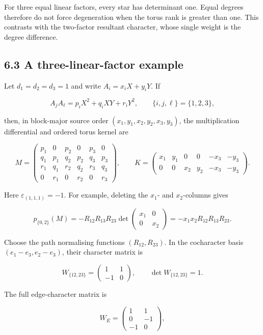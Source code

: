 \documentclass[
  11pt,
  a4paper,
]{article}
\begin{document}
For three equal linear factors, every star has determinant one. Equal
degrees therefore do not force degeneration when the torus rank is
greater than one. This contrasts with the two-factor resultant
character, whose single weight is the degree difference.

\subsection{6.3 A three-linear-factor
example}\label{a-three-linear-factor-example}

Let \(d_1=d_2=d_3=1\) and write \(A_i=x_iX+y_iY\). If

\[
 A_jA_\ell=p_iX^2+q_iXY+r_iY^2,
 \qquad \{i,j,\ell\}=\{1,2,3\},
\]

then, in block-major source order \((x_1,y_1,x_2,y_2,x_3,y_3)\), the
multiplication differential and ordered torus kernel are

\[
 M=
 \begin{pmatrix}
 p_1&0&p_2&0&p_3&0\\
 q_1&p_1&q_2&p_2&q_3&p_3\\
 r_1&q_1&r_2&q_2&r_3&q_3\\
 0&r_1&0&r_2&0&r_3
 \end{pmatrix},
 \qquad
 K=
 \begin{pmatrix}
 x_1&y_1&0&0&-x_3&-y_3\\
 0&0&x_2&y_2&-x_3&-y_3
 \end{pmatrix}.
\]

Here \(\varepsilon_{(1,1,1)}=-1\). For example, deleting the \(x_1\)-
and \(x_2\)-columns gives

\[
 p_{\{0,2\}}(M)
 =-R_{12}R_{13}R_{23}\det
 \begin{pmatrix}x_1&0\\0&x_2\end{pmatrix}
 =-x_1x_2R_{12}R_{13}R_{23}.
\]

Choose the path normalising functions \((R_{12},R_{23})\). In the
cocharacter basis \((e_1-e_3,e_2-e_3)\), their character matrix is

\[
 W_{\{12,23\}}=
 \begin{pmatrix}1&1\\-1&0\end{pmatrix},
 \qquad \det W_{\{12,23\}}=1.
\]

The full edge-character matrix is

\[
 W_E=\begin{pmatrix}1&1\\0&-1\\-1&0\end{pmatrix},
\]
\end{document}
